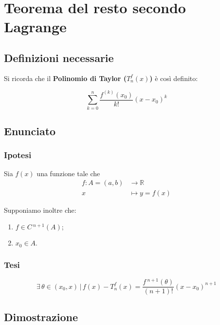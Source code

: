 \documentclass[../dimostrazioni]{subfiles}
\begin{document}
    \chapter{Teorema del resto secondo Lagrange}
    \label{teorestoLagrange}

        \section*{Definizioni necessarie}

            Si ricorda che il \textbf{Polinomio di Taylor (\(T _n ^ f (x) \))} è così definito:

            \[ \sum_{k = 0}^{n} \frac{f^{(k)} (x_0)}{k!}(x-x_0)^k\]

        \section*{Enunciato}

            \subsection*{Ipotesi}

                Sia \(f(x)\) una funzione tale che
                \begin{align*}
                    f : A = (a, b) &\longrightarrow \mathbb{R}\\
                    x &\longmapsto y = f(x) 
                \end{align*}

                Supponiamo inoltre che:

                \begin{enumerate}
                    \indentitem \item \(f \in C\,^{n+1} (A) \);
                    \indentitem \item \(x_0 \in A\).
                \end{enumerate}

            \subsection*{Tesi}

                \[  \exists \, \theta \in (x_0, x) \, | \, f(x) - T _n ^ f (x) = \frac{f\,^{n+1}(\theta)}{(n+1)!}(x-x_0)^{n+1} \]

        \section*{Dimostrazione}
\end{document}
